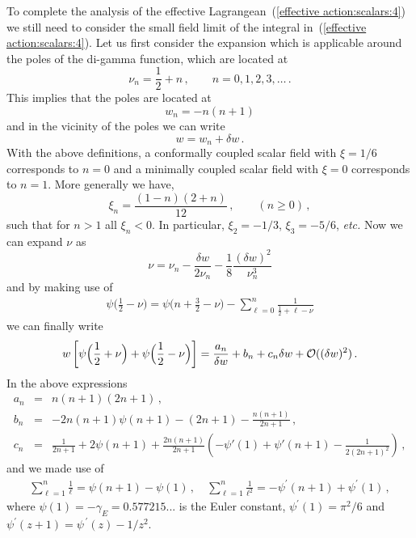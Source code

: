  To complete the analysis of the effective
Lagrangean~(\ref{effective action:scalars:4}) we still need to
consider the small field limit of the integral in~(\ref{effective
action:scalars:4}). Let us first consider the expansion which is
applicable around the poles of the di-gamma function, which are
located at
\begin{equation}
  \nu_n = \frac12 + n\,,\qquad n=0,1,2,3,\dots
\,.
\label{poles of psi}
\end{equation}
This implies that the poles are located at
\begin{equation}
  w_n = -n(n+1)
\label{w_n}
\end{equation}
and in the vicinity of the poles we can write
\begin{equation}
  w = w_n +\delta w
\,.
\label{w}
\end{equation}
With the above definitions, a conformally coupled scalar field with $\xi= 1/6$
corresponds to $n=0$ and a minimally coupled scalar field
with $\xi = 0$ corresponds to $n = 1$. More generally we have,
\begin{equation}
\xi_n = \frac{(1-n)(2+n)}{12}
\,, \qquad (n\geq 0)
\,,
\label{xi_n}
\end{equation}
such that for $n>1$ all $\xi_n<0$.
In particular, $\xi_2 = -1/3$, $\xi_3 = -5/6$, {\it etc.}
Now we can expand $\nu$ as
\begin{equation}
\nu = \nu_n - \frac{\delta w}{2\nu_n}-\frac18\frac{(\delta
w)^2}{\nu_n^{3}}
\end{equation}
and by making use of
\begin{eqnarray}
 \psi\Big(\frac12 -\nu\Big) =  \psi\Big(n + \frac32 - \nu\Big)
                             - \sum_{\ell=0}^{n} \frac{1}{\frac12 + \ell - \nu}
\label{psi-log}
\end{eqnarray}
we can finally write
\begin{eqnarray}
 w\left[\psi\Big(\frac12 + \nu\Big) + \psi\Big(\frac12
 -\nu\Big)\right]
         = \frac{a_n}{\delta w} + b_n + c_n\delta w
   + {\cal O}((\delta w)^2)
\,.
\label{psi-log:2}
\end{eqnarray}
In the above expressions
\begin{eqnarray}
a_n & = & n(n+1)(2n+1)
\,,
\nonumber\\
b_n & = & -2n(n+1)\psi(n+1)-(2n+1)-\frac{n(n+1)}{2n+1}
\,,
\nonumber\\
c_n & = & \frac{1}{2n+1}+2\psi(n+1)
     +\frac{2n(n+1)}{2n+1}\left(-\psi'(1)+\psi'(n+1)-\frac{1}{2(2n+1)^2}\right)
\,,
\label{abc}
\end{eqnarray}
and we made use of
\begin{eqnarray}
 \sum_{\ell=1}^n\frac{1}{\ell} = \psi(n+1)-\psi(1)
\,,\quad
 \sum_{\ell=1}^n\frac{1}{\ell^2} = -\psi^\prime(n+1)+\psi^\prime(1)
\,,
\label{psi-log:3}
\end{eqnarray}
where $\psi(1)=-\gamma_E = 0.577215...$ is the Euler constant,
$\psi^\prime(1) = \pi^2/6$ and $\psi^\prime(z+1) = \psi^{\,\prime}(z) - 1/z^2$.

